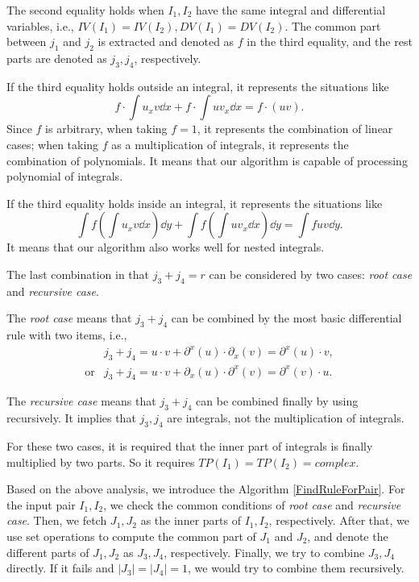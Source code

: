 The second equality holds when $I_1,I_2$ have the same integral and differential variables, i.e., $IV(I_1)=IV(I_2),DV(I_1)=DV(I_2)$. The common part between $j_1$ and $j_2$ is extracted and denoted as $f$ in the third equality, and the rest parts are denoted as $j_3,j_4$, respectively.

If the third equality holds outside an integral, it represents the situations like 
\begin{equation}
f\cdot\int\!{u_x v\dd x}+f\cdot\int\!{u v_x \dd x} = f\cdot(uv).
\end{equation} 
Since $f$ is arbitrary, when taking $f=1$, it represents the combination of linear cases; when taking $f$ as a multiplication of integrals, it represents the combination of polynomials. It means that our algorithm is capable of processing polynomial of integrals. 

If the third equality holds inside an integral, it represents the situations like 
\begin{equation}
\int\!{f \left(\int\!{u_x v\dd x}\right)\dd y}+\int\!{f \left(\int\!{u v_x \dd x}\right) \dd y} = \int\!{fuv\dd y}.
\end{equation}
It means that our algorithm also works well for nested integrals. 

The last combination in  that $j_3+j_4=r$ can be considered by two cases: \emph{root case} and \emph{recursive case}. 

The \emph{root case} means that $j_3+j_4$ can be combined by the most basic differential rule with two items, i.e., 
\begin{equation}
\begin{array}{rl}
& j_3+j_4=u \cdot v+\partial^x(u)\cdot \partial_x(v) = \partial^x(u)\cdot v, \\
\text{or}& j_3+j_4=u \cdot v+\partial_x(u)\cdot \partial^x(v) = \partial^x(v)\cdot u.
\end{array}
\label{root_form}
\end{equation}

The \emph{recursive case} means that $j_3+j_4$ can be combined  finally by using   recursively. It implies that $j_3,j_4$ are integrals, not the multiplication of integrals.

For these two cases, it is required that the inner part of integrals is finally multiplied by two parts. So it requires $TP(I_1)=TP(I_2)=complex$.  

Based on the above analysis, we introduce the Algorithm \ref{FindRuleForPair}. For the input pair $I_1,I_2$, we check the common conditions of \emph{root case} and \emph{recursive case}. Then, we fetch $J_1,J_2$ as the inner parts of $I_1,I_2$, respectively. After that, we use set operations to compute the common part of $J_1$ and $J_2$, and denote the different parts of $J_1,J_2$ as $J_3,J_4$, respectively. Finally, we try to combine $J_3,J_4$ directly. If it fails and $|J_3|=|J_4|=1$, we would try to combine them recursively.  

